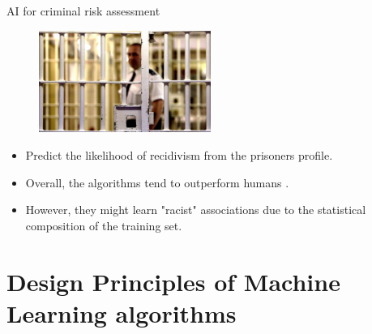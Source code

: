 \documentclass[xcolor=pdftex,dvipsnames,table]{beamer}
\begin{document}
\begin{frame}{AI for criminal risk assessment}
\begin{figure}[htb]
\includegraphics[width=0.5\textwidth]{../graphics/jail.jpg}
\end{figure}
\begin{itemize}
\item<1-> Predict the likelihood of recidivism from the prisoners profile.
\item<2-> Overall, the algorithms tend to outperform humans \cite{Lin2020}. 
\item<3-> However, they might learn "racist" associations due to the statistical composition of the training set. 
\end{itemize}
\end{frame}



\section{Design Principles of Machine Learning algorithms}
\end{document}
